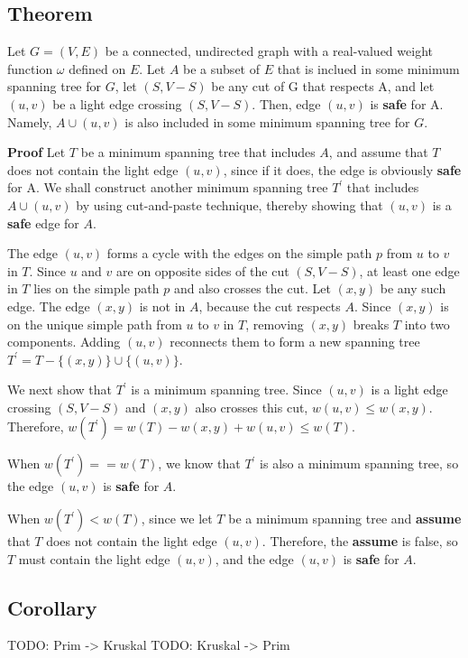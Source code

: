 \subsection {Theorem}

Let $G=(V, E)$ be a connected, undirected graph with a real-valued weight
function $\omega$ defined on $E$. Let $A$ be a subset of $E$ that is inclued in
some minimum spanning tree for $G$, let $(S, V - S)$ be any cut of G that
respects A, and let $(u, v)$ be a light edge crossing $(S, V - S)$. Then, edge
$(u, v)$ is \textbf{safe} for A. {\color{red} Namely, $ A \cup {(u, v)}$ is also
included in some minimum spanning tree for $G$.}

\textbf{Proof} Let $T$ be a minimum spanning tree that includes $A$, and
{\color{red}assume that $T$ does not contain the light edge $(u, v)$}, since if
it does, the edge is obviously \textbf{safe} for A. We shall construct another
minimum spanning tree $T^{'}$ that includes $A \cup {(u, v)}$ by using
cut-and-paste technique, thereby showing that $(u, v)$ is a \textbf{safe} edge
for $A$.

The edge $(u, v)$ forms a {\color{red}cycle} with the edges on the simple path
$p$ from $u$ to $v$ in $T$. Since $u$ and $v$ are on opposite sides of the cut
$(S, V - S)$, at least one edge in $T$ lies on the simple path $p$ and also
crosses the cut. Let $(x, y)$ be any such edge. The edge $(x, y)$ is not in $A$,
because the cut respects $A$. Since $(x, y)$ is on the unique simple path from
$u$ to $v$ in $T$, removing $(x, y)$ breaks $T$ into two components. Adding
$(u, v)$ reconnects them to form a new spanning tree
$T^{'} = T - \{(x, y)\} \cup \{(u, v)\}$.

We next show that $T^{'}$ is a minimum spanning tree. Since $(u, v)$ is a light
edge crossing $(S, V - S)$ and $(x, y)$ also crosses this cut,
$w(u, v) \leq  w(x, y)$. Therefore,
$w(T^{'}) = w(T) - w(x, y) + w(u, v) \leq w(T)$.

When $w(T^{'}) == w(T)$, we know that $T^{'}$ is also a minimum spanning tree,
so the edge $(u, v)$ is \textbf{safe} for $A$.

When $w(T^{'}) < w(T)$, since we let $T$ be a minimum spanning tree and
\textbf{assume} that $T$ does not contain the light edge $(u, v)$. Therefore,
the \textbf{assume} is false, so $T$ must contain the light edge $(u, v)$, and
the edge $(u, v)$ is \textbf{safe} for $A$.

\subsection {Corollary}

TODO: Prim -> Kruskal
TODO: Kruskal -> Prim

